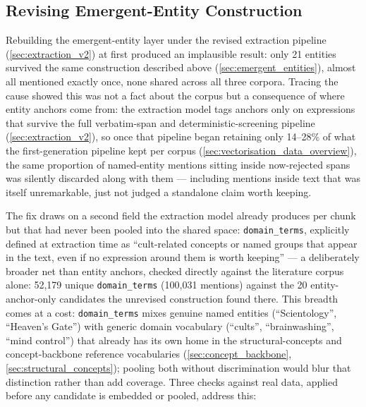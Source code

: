 \subsection{Revising Emergent-Entity Construction}\label{sec:emergent_entities_v2}

Rebuilding the emergent-entity layer under the revised extraction pipeline (\ref{sec:extraction_v2}) at first produced an implausible result: only 21 entities survived the same construction described above (\ref{sec:emergent_entities}), almost all mentioned exactly once, none shared across all three corpora. Tracing the cause showed this was not a fact about the corpus but a consequence of where entity anchors come from: the extraction model tags anchors only on expressions that survive the full verbatim-span and deterministic-screening pipeline (\ref{sec:extraction_v2}), so once that pipeline began retaining only 14--28\% of what the first-generation pipeline kept per corpus (\ref{sec:vectorisation_data_overview}), the same proportion of named-entity mentions sitting inside now-rejected spans was silently discarded along with them — including mentions inside text that was itself unremarkable, just not judged a standalone claim worth keeping.

The fix draws on a second field the extraction model already produces per chunk but that had never been pooled into the shared space: \texttt{domain\_terms}, explicitly defined at extraction time as \enquote{cult-related concepts or named groups that appear in the text, even if no expression around them is worth keeping} — a deliberately broader net than entity anchors, checked directly against the literature corpus alone: 52{,}179 unique \texttt{domain\_terms} (100{,}031 mentions) against the 20 entity-anchor-only candidates the unrevised construction found there. This breadth comes at a cost: \texttt{domain\_terms} mixes genuine named entities (\enquote{Scientology}, \enquote{Heaven's Gate}) with generic domain vocabulary (\enquote{cults}, \enquote{brainwashing}, \enquote{mind control}) that already has its own home in the structural-concepts and concept-backbone reference vocabularies (\ref{sec:concept_backbone}, \ref{sec:structural_concepts}); pooling both without discrimination would blur that distinction rather than add coverage. Three checks against real data, applied before any candidate is embedded or pooled, address this:

